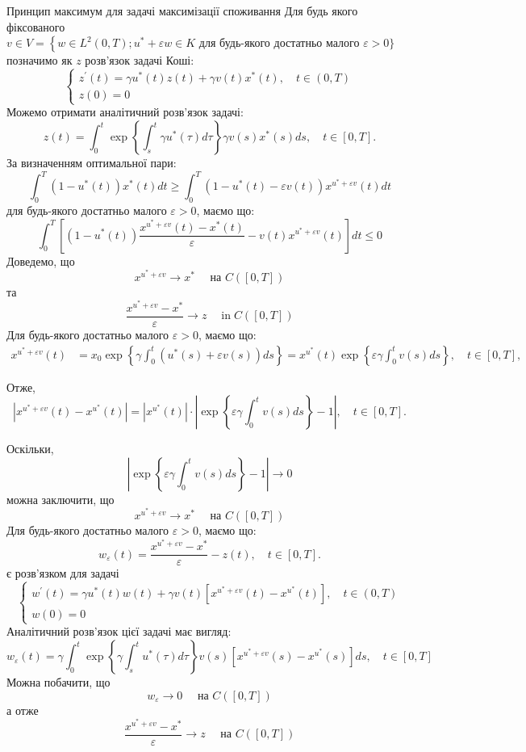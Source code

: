 \documentclass[a4paper,12pt]{extreport}
\begin{document}
Принцип максимум для задачі максимізації споживання
Для будь якого фіксованого  $v \in V=\left\{w \in L^2(0, T) ; u^*+\varepsilon w \in\right. K \text { для будь-якого достатньо малого } \varepsilon>0 \}$ позначимо як  $z$ розв'язок задачі Коші:
$$
\left\{\begin{array}{l}
z^{\prime}(t)=\gamma u^*(t) z(t)+\gamma v(t) x^*(t), \quad t \in(0, T) \\
z(0)=0
\end{array}\right.
$$
Можемо отримати аналітичний розв'язок задачі:
$$
z(t)=\int_0^t \exp \left\{\int_s^t \gamma u^*(\tau) d \tau\right\} \gamma v(s) x^*(s) d s, \quad t \in[0, T] .
$$
За визначенням оптимальної пари:
$$
\int_0^T\left(1-u^*(t)\right) x^*(t) d t \geq \int_0^T\left(1-u^*(t)-\varepsilon v(t)\right) x^{u^*+\varepsilon v}(t) d t
$$
для будь-якого достатньо малого $\varepsilon>0$, маємо що:
$$
\int_0^T\left[\left(1-u^*(t)\right) \frac{x^{u^*+\varepsilon v}(t)-x^*(t)}{\varepsilon}-v(t) x^{u^*+\varepsilon v}(t)\right] d t \leq 0
$$
Доведемо, що 
$$
x^{u^*+\varepsilon v} \longrightarrow x^* \quad \text { на } C([0, T])
$$
та
$$
\frac{x^{u^*+\varepsilon v}-x^*}{\varepsilon} \longrightarrow z \quad \operatorname{in} C([0, T])
$$
Для будь-якого достатньо малого $\varepsilon>0$, маємо що:
$$
\begin{aligned}
x^{u^*+\varepsilon v}(t) &=x_0 \exp \left\{\gamma \int_0^t\left(u^*(s)+\varepsilon v(s)\right) d s\right\} 
=x^{u^*}(t) \exp \left\{\varepsilon \gamma \int_0^t v(s) d s\right\}, \quad t \in[0, T],
\end{aligned}
$$

Отже,
$$
\left|x^{u^*+\varepsilon v}(t)-x^{u^*}(t)\right|=\left|x^{u^*}(t)\right| \cdot\left|\exp \left\{\varepsilon \gamma \int_0^t v(s) d s\right\}-1\right|, \quad t \in[0, T] .
$$

Оскільки,
$$
\left|\exp \left\{\varepsilon \gamma \int_0^t v(s) d s\right\}-1\right| \longrightarrow 0
$$
можна заключити, що 
$$
x^{u^*+\varepsilon v} \longrightarrow x^* \quad \text { на } C([0, T])
$$
Для будь-якого достатньо малого $\varepsilon>0$, маємо що:
$$
w_{\varepsilon}(t)=\frac{x^{u^*+\varepsilon v}-x^*}{\varepsilon}-z(t), \quad t \in[0, T] .
$$
є розв'язком для задачі
$$
\left\{\begin{array}{l}
w^{\prime}(t)=\gamma u^*(t) w(t)+\gamma v(t)\left[x^{u^*+\varepsilon v}(t)-x^{u^*}(t)\right], \quad t \in(0, T) \\
w(0)=0
\end{array}\right.
$$
Аналітичний розв'язок цієї задачі має вигляд:
$$
w_{\varepsilon}(t)=\gamma \int_0^t \exp \left\{\gamma \int_s^t u^*(\tau) d \tau\right\} v(s)\left[x^{u^*+\varepsilon v}(s)-x^{u^*}(s)\right] d s, \quad t \in[0, T]
$$
Можна побачити, що 
$$
w_{\varepsilon} \longrightarrow 0 \quad \text { на } C([0, T])
$$
а отже
$$
\frac{x^{u^*+\varepsilon v}-x^*}{\varepsilon} \longrightarrow z \quad \text { на } C([0, T])
$$
\end{document}
